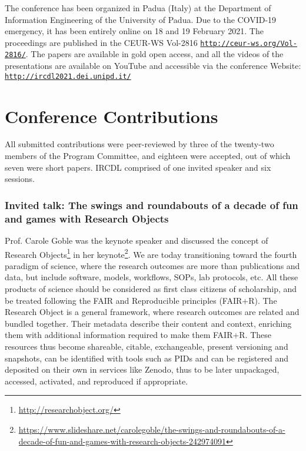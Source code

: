 \documentclass[sigconf, nonacm]{acmart}
\begin{document}
The conference has been organized in Padua (Italy) at the Department of Information Engineering of the University of Padua. Due to the COVID-19 emergency, it has been entirely online on 18 and 19 February 2021. The proceedings are published in the CEUR-WS  Vol-2816 \texttt{\url{http://ceur-ws.org/Vol-2816/}}. The papers are available in gold open access, and all the videos of the presentations are available on YouTube and accessible via the conference Website: \texttt{\url{http://ircdl2021.dei.unipd.it/}}

\section{Conference Contributions}
All submitted contributions were peer-reviewed by three of the twenty-two members of the Program Committee, and eighteen were accepted, out of which seven were short papers. IRCDL comprised of one invited speaker and six sessions.

\subsubsection*{Invited talk: The swings and roundabouts of a decade of fun and games with Research Objects} Prof. Carole Goble was the keynote speaker and discussed the concept of Research Objects\footnote{\url{http://researchobject.org/}}\cite{bechhofer2013linked} in her keynote\footnote{\url{https://www.slideshare.net/carolegoble/the-swings-and-roundabouts-of-a-decade-of-fun-and-games-with-research-objects-242974091}}. We are today transitioning toward the fourth paradigm of science, where the research outcomes are more than publications and data, but include software, models, workflows, SOPs, lab protocols, etc. All these products of science should be considered as first class citizens of scholarship, and be treated following the FAIR and Reproducible principles (FAIR+R). 
The Research Object is a general framework, where research outcomes are related and bundled together. Their metadata describe their content and context, enriching them with additional information required to make them FAIR+R. These resources thus become shareable, citable, exchangeable, present versioning and snapshots, can be identified with tools such as PIDs and can be registered and deposited on their own in services like Zenodo, thus to be later unpackaged, accessed, activated, and reproduced if appropriate. 
\end{document}
